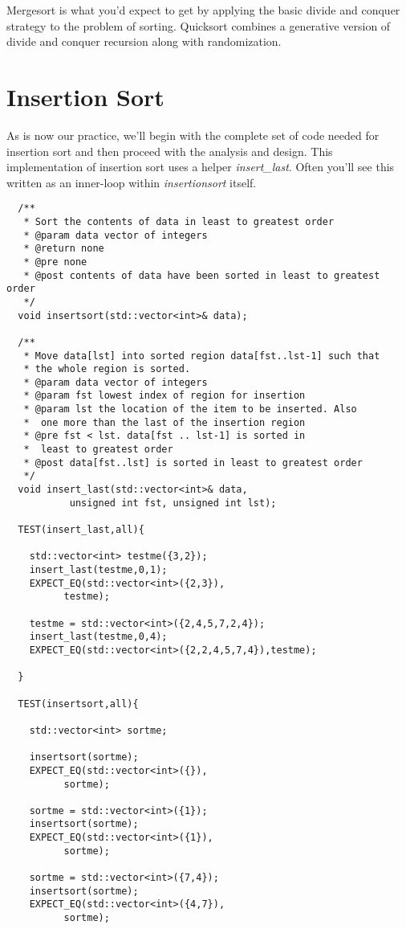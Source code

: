 \documentclass[]{tufte-handout}
\begin{document}
Mergesort is what you'd expect to get by applying the basic divide and conquer strategy to the problem of sorting. Quicksort combines a generative version of divide and conquer recursion along with randomization. 

\section{Insertion Sort}

As is now our practice, we'll begin with the complete set of code needed for insertion sort and then proceed with the analysis and design. This implementation of insertion sort uses a helper \textit{insert\_last}.  Often you'll see this written as an inner-loop within \textit{insertionsort} itself. 
\begin{verbatim}
  /**
   * Sort the contents of data in least to greatest order
   * @param data vector of integers
   * @return none
   * @pre none
   * @post contents of data have been sorted in least to greatest order
   */
  void insertsort(std::vector<int>& data);

  /**
   * Move data[lst] into sorted region data[fst..lst-1] such that 
   * the whole region is sorted. 
   * @param data vector of integers
   * @param fst lowest index of region for insertion
   * @param lst the location of the item to be inserted. Also
   *  one more than the last of the insertion region
   * @pre fst < lst. data[fst .. lst-1] is sorted in 
   *  least to greatest order
   * @post data[fst..lst] is sorted in least to greatest order
   */
  void insert_last(std::vector<int>& data, 
		   unsigned int fst, unsigned int lst);

  TEST(insert_last,all){
    
    std::vector<int> testme({3,2});
    insert_last(testme,0,1);
    EXPECT_EQ(std::vector<int>({2,3}),
	      testme);

    testme = std::vector<int>({2,4,5,7,2,4});
    insert_last(testme,0,4);
    EXPECT_EQ(std::vector<int>({2,2,4,5,7,4}),testme);
    
  }

  TEST(insertsort,all){
    
    std::vector<int> sortme;

    insertsort(sortme);
    EXPECT_EQ(std::vector<int>({}),
	      sortme);

    sortme = std::vector<int>({1});
    insertsort(sortme);
    EXPECT_EQ(std::vector<int>({1}),
	      sortme);

    sortme = std::vector<int>({7,4});
    insertsort(sortme);
    EXPECT_EQ(std::vector<int>({4,7}),
	      sortme);


\end{verbatim}
\end{document}
